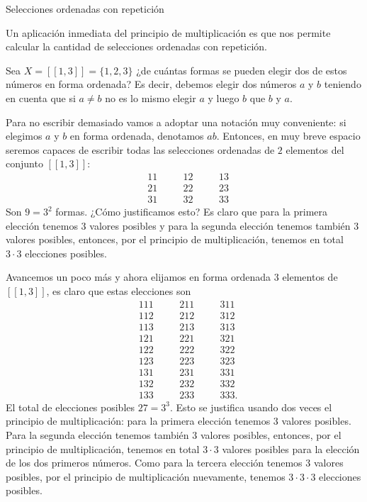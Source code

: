 \begin{section}{Selecciones ordenadas con repetición}

Un aplicación inmediata del principio de multiplicación  es que nos permite calcular la cantidad de selecciones ordenadas con repetición. 

\begin{ejemplo} Sea  $X = [[ 1 , 3]] = \{ 1, 2, 3 \}$ ¿de cuántas formas se pueden elegir dos de estos números en forma ordenada?
Es decir, debemos elegir dos números $a$ y $b$ teniendo en cuenta que si $a\not=b$ no es lo mismo elegir $a$ y luego $b$ que $b$ y $a$.  

Para no escribir demasiado vamos a adoptar una notación muy conveniente: si elegimos $a$ y $b$ en forma ordenada, denotamos $ab$. Entonces, en muy breve espacio seremos capaces de escribir todas las selecciones ordenadas de $2$ elementos del  conjunto  $[[ 1 , 3]]$:
\begin{align*}
&11&\quad &12&\quad &13 \\
&21&\quad &22&\quad &23\\
&31&\quad &32&\quad &33
\end{align*}
Son $9 = 3^2$ formas. ¿Cómo justificamos esto? Es claro que para la primera elección tenemos $3$ valores posibles y para la segunda elección tenemos también $3$ valores posibles, entonces, por el principio de multiplicación, tenemos en total $3\cdot 3$ elecciones posibles.  

Avancemos un poco más y ahora elijamos en forma ordenada $3$ elementos de  $[[ 1 , 3]]$, es claro que estas elecciones son
\begin{align*}
&1 1 1&\quad &211&\quad &311 \\
&1 1 2&\quad & 212&\quad & 312\\
&1 1 3&\quad & 213&\quad & 313\\
&1 2 1&\quad & 221&\quad & 321\\
&1 2 2&\quad & 222&\quad & 322\\
&1 2 3&\quad & 223&\quad & 323\\
&1 3 1&\quad & 231&\quad & 331\\
&1 3 2&\quad & 232&\quad & 332\\
&1 3 3&\quad & 233&\quad & 333.
\end{align*}
El total de elecciones posibles $27 = 3^3$. Esto se justifica usando dos veces el principio de multiplicación: para la primera elección tenemos $3$ va\-lo\-res posibles. Para la segunda elección tenemos también $3$ valores posibles, entonces, por el principio de multiplicación, tenemos en total $3\cdot 3$ va\-lo\-res posibles para la elección de los dos primeros números. Como para la tercera elección tenemos $3$ valores posibles, por el principio de multiplicación nuevamente, tenemos   $3\cdot 3 \cdot 3$ elecciones posibles.





\end{ejemplo}
\end{section}
